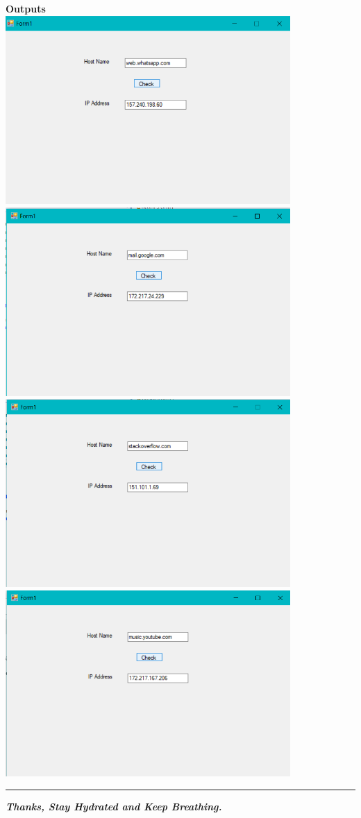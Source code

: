 \documentclass{article}
\begin{document}
	\begin{center}
		\textbf{Outputs}\\
		\hfill\break\includegraphics[width=4.27in]{1.png}\\
		\hfill\break\includegraphics[width=4.27in]{2.png}\\
		\hfill\break\includegraphics[width=4.27in]{3.png}\\
		\hfill\break\includegraphics[width=4.27in]{4.png}\\
		\hfill\break\rule{6.27in}{1.2pt}
		\hfill\break\textbf{\emph{Thanks, Stay Hydrated and Keep Breathing.}}
	\end{center}
\end{document}
